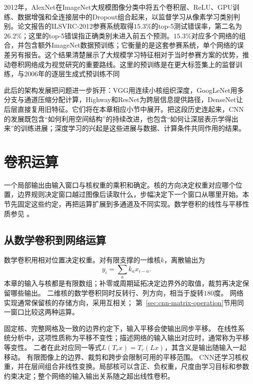 2012年，AlexNet在ImageNet大规模图像分类中将五个卷积层、ReLU、GPU训练、数据增强和全连接层中的Dropout组合起来，以监督学习从像素学习类别判别。论文报告的ILSVRC-2012参赛系统取得$15.3\%$的top-5测试错误率，第二名为$26.2\%$；这里的top-5错误指正确类别未进入前五个预测。$15.3\%$对应多个网络的组合，并包含额外ImageNet数据预训练；它衡量的是这套参赛系统，单个网络的误差另有报告。这个结果清楚展示了大规模学习特征相对于当时参赛方案的优势，推动卷积网络成为视觉研究的重要路线。这里的预训练是在更大标签集上的监督训练，与2006年的逐层生成式预训练不同

此后的架构发展把问题进一步拆开：VGG用连续小核组织深度，GoogLeNet用多分支与通道压缩分配计算，Highway和ResNet为跨层信息提供路径，DenseNet让后层直接复用旧特征。它们将在本章相应小节中展开。把这段历史连起来，CNN的发展既包含“如何利用空间结构”的持续改进，也包含“如何让深层表示学得出来”的训练进展；深度学习的兴起是这些进展与数据、计算条件共同作用的结果。

\section{卷积运算}
\label{sec:cnn-convolution}

一个局部输出由输入窗口与核权重的乘积和确定。核的方向决定权重对应哪个位置，边界规则决定窗口越过图像后读取什么，步幅决定下一个窗口从哪里开始。本节先固定这些约定，再把运算扩展到多通道及不同实现。数学卷积的线性与平移性质参见
。

\subsection{从数学卷积到网络运算}
\label{sec:cnn-convolution-definition}

数学卷积用相对位置决定权重。对有限支撑的一维核$k$，离散输出为
\[
  y_i=\sum_a k_a x_{i-a}.
\]
本章的输入与核都是有限数组；补零或周期延拓决定边界外的取值，裁剪再决定保留哪些输出。
二维核的数学卷积同时反转行、列方向，相当于旋转$180$度。
网络实现通常保留核的存储方向，采用互相关；
第~\ref{sec:cnn-matrix-operation}节用同一窗口比较这两种运算。

固定核、完整网格及一致的边界约定下，输入平移会使输出同步平移。
在线性系统分析中，这项性质称为平移不变性；描述网络的输入输出对应时，通常称为平移等变性。
二者在此对应同一等式$L(T_rx)=T_r(Lx)$，其含义是输出随输入一起移动。
有限图像上的边界、裁剪和跨步会限制可用的平移范围。
CNN还学习核权重，并在层间组合非线性变换。局部核可以含正、负权重，尺度由学习目标和参数约束决定；整个网络的输入输出关系随之超出线性卷积。

